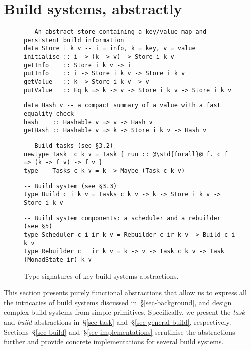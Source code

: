 \section{Build systems, abstractly}\label{sec-abstractions}
\vspace{-0.5mm}

\begin{figure}
\vspace{-1mm}
\begin{verbatim}
-- An abstract store containing a key/value map and persistent build information
data Store i k v -- i = info, k = key, v = value
initialise :: i -> (k -> v) -> Store i k v
getInfo    :: Store i k v -> i
putInfo    :: i -> Store i k v -> Store i k v
getValue   :: k -> Store i k v -> v
putValue   :: Eq k => k -> v -> Store i k v -> Store i k v
\end{verbatim}
\vspace{-1mm}
\begin{verbatim}
data Hash v -- a compact summary of a value with a fast equality check
hash    :: Hashable v => v -> Hash v
getHash :: Hashable v => k -> Store i k v -> Hash v
\end{verbatim}
\vspace{-1mm}
\begin{verbatim}
-- Build tasks (see §3.2)
newtype Task  c k v = Task { run :: @\std{forall}@ f. c f => (k -> f v) -> f v }
type    Tasks c k v = k -> Maybe (Task c k v)
\end{verbatim}
\vspace{-1mm}
\begin{verbatim}
-- Build system (see §3.3)
type Build c i k v = Tasks c k v -> k -> Store i k v -> Store i k v
\end{verbatim}
\vspace{-1mm}
\begin{verbatim}
-- Build system components: a scheduler and a rebuilder (see §5)
type Scheduler c i ir k v = Rebuilder c ir k v -> Build c i k v
type Rebuilder c   ir k v = k -> v -> Task c k v -> Task (MonadState ir) k v
\end{verbatim}
\vspace{-3.5mm}
\caption{Type signatures of key build systems abstractions.}\label{fig-types}
\vspace{-4.5mm}
\end{figure}

This section presents purely functional abstractions that allow us to express
all the intricacies of build systems discussed in~\S\ref{sec-background},
and design complex build systems from simple primitives. Specifically, we
present the \emph{task} and \emph{build} abstractions in~\S\ref{sec-task}
and~\S\ref{sec-general-build}, respectively. Sections~\S\ref{sec-build}
and~\S\ref{sec-implementations} scrutinise the abstractions further and provide
concrete implementations for several build systems.

